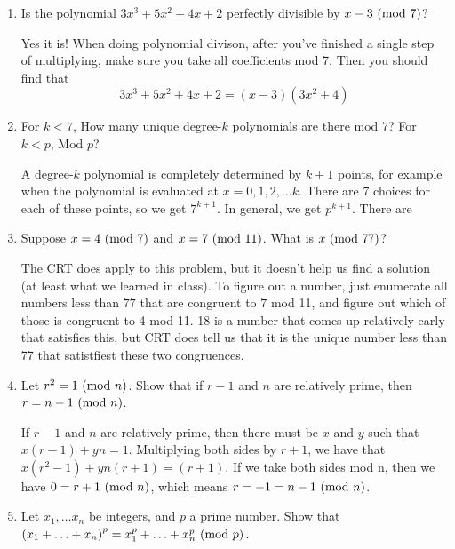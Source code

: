 \documentclass{article}
\begin{document}
\begin{enumerate}
\begin{solution}
        \end{solution}
        \item Is the polynomial $3 x^3 + 5x^2 + 4x + 2$ perfectly divisible by $x-3 \ (\textnormal{mod } 7)$?
        \begin{solution}
        Yes it is! When doing polynomial divison, after you've finished a single step of multiplying, make sure you take all coefficients mod 7. Then you should find that
        \[
            3 x^3 + 5x^2 + 4x + 2 = (x - 3) (3x^2 + 4)
        \]
        \end{solution}
        \item For $k < 7$, How many unique degree-$k$ polynomials are there mod $7$? For $k < p$, Mod $p$?
        \begin{solution}
            A degree-$k$ polynomial is completely determined by $k+1$ points, for example when the polynomial is evaluated at
            $x = 0, 1, 2, \ldots k$. There are 7 choices for each of these points, so we get $7^{k+1}$. In general, we get $p^{k+1}$.
            There are 
        \end{solution}
        \item Suppose $x=4 \textnormal{ (mod } 7 ) $ and $x=7 \textnormal{ (mod }11) $. What is $x \textnormal{ (mod }77)$?
        \begin{solution}
            The CRT does apply to this problem, but it doesn't help us find a solution (at least what we learned in class). To figure out
            a number, just enumerate all numbers less than $77$ that are congruent to $7$ mod 11, and figure out which of those is congruent to 4 mod 11.
            18 is a number that comes up relatively early that satisfies this, but CRT does tell us that it is the unique number less than 77 that satistfiest
            these two congruences.
        \end{solution}
        \item Let $r^2 = 1 \textnormal{ (mod } n)$. Show that if $r-1$ and $n$ are relatively prime, then $r = n - 1 \textnormal{ (mod } n)$.
        \begin{solution}
            If $r-1$ and $n$ are relatively prime, then there must be $x$ and $y$ such that $x(r-1) + yn = 1$. Multiplying both sides by $r+1$, we have that $x(r^2 - 1) + yn (r + 1) = (r + 1)$. If we take
            both sides mod n, then we have $0 = r + 1 \textnormal{ (mod } n )$, which means $r = -1 = n -1 \textnormal{ (mod } n )$.
        \end{solution}
        \item Let $x_1, \ldots x_n$ be integers, and $p$ a prime number. Show that $\left(x_1 + \ldots + x_n\right)^p = x_1^p + \ldots + x_n^p \textnormal{ (mod } p)$.

\end{enumerate}
\end{document}
